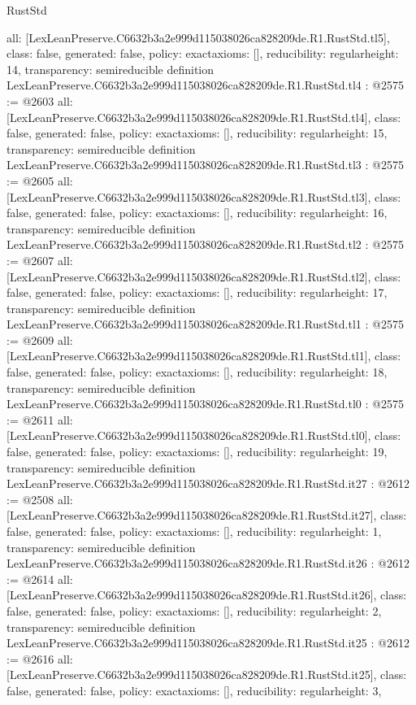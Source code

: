 \begin{lexlean}{RustStd}
\begin{coremodule}
{  all: [LexLeanPreserve.C6632b3a2e999d115038026ca828209de.R1.RustStd.tl5],
  class: false,
  generated: false,
  policy: exact{axioms: []},
  reducibility: regular{height: 14},
  transparency: semireducible
}
definition LexLeanPreserve.C6632b3a2e999d115038026ca828209de.R1.RustStd.tl4 : @2575 := @2603 {
  all: [LexLeanPreserve.C6632b3a2e999d115038026ca828209de.R1.RustStd.tl4],
  class: false,
  generated: false,
  policy: exact{axioms: []},
  reducibility: regular{height: 15},
  transparency: semireducible
}
definition LexLeanPreserve.C6632b3a2e999d115038026ca828209de.R1.RustStd.tl3 : @2575 := @2605 {
  all: [LexLeanPreserve.C6632b3a2e999d115038026ca828209de.R1.RustStd.tl3],
  class: false,
  generated: false,
  policy: exact{axioms: []},
  reducibility: regular{height: 16},
  transparency: semireducible
}
definition LexLeanPreserve.C6632b3a2e999d115038026ca828209de.R1.RustStd.tl2 : @2575 := @2607 {
  all: [LexLeanPreserve.C6632b3a2e999d115038026ca828209de.R1.RustStd.tl2],
  class: false,
  generated: false,
  policy: exact{axioms: []},
  reducibility: regular{height: 17},
  transparency: semireducible
}
definition LexLeanPreserve.C6632b3a2e999d115038026ca828209de.R1.RustStd.tl1 : @2575 := @2609 {
  all: [LexLeanPreserve.C6632b3a2e999d115038026ca828209de.R1.RustStd.tl1],
  class: false,
  generated: false,
  policy: exact{axioms: []},
  reducibility: regular{height: 18},
  transparency: semireducible
}
definition LexLeanPreserve.C6632b3a2e999d115038026ca828209de.R1.RustStd.tl0 : @2575 := @2611 {
  all: [LexLeanPreserve.C6632b3a2e999d115038026ca828209de.R1.RustStd.tl0],
  class: false,
  generated: false,
  policy: exact{axioms: []},
  reducibility: regular{height: 19},
  transparency: semireducible
}
definition LexLeanPreserve.C6632b3a2e999d115038026ca828209de.R1.RustStd.it27 : @2612 := @2508 {
  all: [LexLeanPreserve.C6632b3a2e999d115038026ca828209de.R1.RustStd.it27],
  class: false,
  generated: false,
  policy: exact{axioms: []},
  reducibility: regular{height: 1},
  transparency: semireducible
}
definition LexLeanPreserve.C6632b3a2e999d115038026ca828209de.R1.RustStd.it26 : @2612 := @2614 {
  all: [LexLeanPreserve.C6632b3a2e999d115038026ca828209de.R1.RustStd.it26],
  class: false,
  generated: false,
  policy: exact{axioms: []},
  reducibility: regular{height: 2},
  transparency: semireducible
}
definition LexLeanPreserve.C6632b3a2e999d115038026ca828209de.R1.RustStd.it25 : @2612 := @2616 {
  all: [LexLeanPreserve.C6632b3a2e999d115038026ca828209de.R1.RustStd.it25],
  class: false,
  generated: false,
  policy: exact{axioms: []},
  reducibility: regular{height: 3},
}
\end{coremodule}
\end{lexlean}
